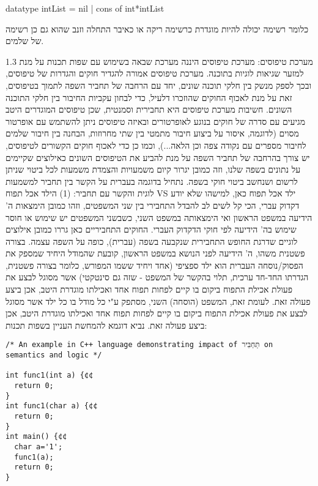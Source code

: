      datatype intList = nil | cons of int*intList

      כלומר רשימה יכולה להיות מוגדרת כרשימה ריקה או כאיבר התחלה וזנב שהוא גם כן רשימה של שלמים.

      1.3 מערכת טיפוסים:
      מערכת טיפוסים היננה מערכת שבאה בשימוש עם שפות תכנות על מנת למזער שגיאות לוגיות
      בתוכנה. מערכת טיפוסים אמורה להגדיר חוקים והגדרות של טיפוסים, ובכך לספק מנשק בין
      חלקי תוכנה שונים, יחד עם הרחבה של תחביר השפה לתמוך בטיפוסים, זאת על מנת לאכוף
      החוקים שהוזכרו דלעיל, כדי לבחון עקביות החיבור בין חלקי התוכנה השונים. חשיבות
      מערכת טיפוסים היא תחבירית וסמנטית, שכן טיפוסים המוגדרים היטב מגיעים עם סדרה של
      חוקים בנוגע לאופרטורים ובאיזה טיפוסים ניתן להשתמש עם אופרטור מסוים (לדוגמה,
      איסור על ביצוע חיבור מתמטי בין שתי מחרוזות, הבחנה בין חיבור שלמים לחיבור מספרים
      עם נקודה צפה וכן הלאה...), וכמו כן כדי לאכוף חוקים הקשורים לטיפוסים, יש צורך
      בהרחבה של תחביר השפה על מנת להביע את הטיפוסים השונים כאילוצים שקיימים על נתונים
      בשפה שלנו, וזה כמובן יגרור קיום משמעויות והצמדת משמעות לכל ביטוי שניתן לרשום
      ושנחשב ביטוי חוקי בשפה. נתחיל בדוגמה בעברית על הקשר בין תחביר למשמעות לוגית
      והקשר עם תחביר:
      (1) הילד אכל תפוח VS ילד אכל תפוח כאן, למישהו שלא יודע דקדוק עברי, הכי
      קל לשים לב להבדל התחבירי בין שני המשפטים, וזהו כמובן הימצאות ה' הידיעה במשפט
      הראשון ואי הימצאותה במשפט השני, כשבשני המשפטים יש שימוש או חוסר שימוש בה'
      הידיעה לפי חוקי הדקדוק העברי. החוקים התחביריים כאן גררו כמובן אילוצים לוגיים
      שדרגת החופש התחבירית שנקבעה בשפה (עברית), כופה על השפה עצמה. בצורה פשטנית משהו,
      ה' הידיעה לפני הנושא במשפט הראשון, קובעת שהמודל היחיד שמספק את הפסוק/נוסחה
      העברית הוא ילד ספציפי (אחד ויחיד ששמו המפורש, כלומר בצורה פשטנית, הגדרתו החד-חד
      ערכית, תלוי בהקשר של המשפט - שזה גם סינטקטי) אשר מסוגל לבצע את פעולת אכילת
      התפוח ביקום בו קיים לפחות תפוח אחד ואכילתו מוגדרת היטב, אכן ביצע פעולה זאת.
      לעומת זאת, המשפט (הוסחה) השני, מסתפק ע"י כל מודל בו כל ילד אשר מסוגל לבצע את
      פעולת אכילת התפוח ביקום בו קיים לפחות תפוח אחד ואכילתו מוגדרת היטב, אכן ביצע
      פעולה זאת.
      נביא דוגמא להמחשת העניין בשפות תכנות:
\begin{verbatim}
/* An example in C++ language demonstrating impact of תַּחְבִּיר on semantics and logic */

int func1(int a) {¢¢
  return 0;
}
int func1(char a) {¢¢
  return 0;
}
int main() {¢¢
  char a='1';
  func1(a);
  return 0;
}
\end{verbatim}

